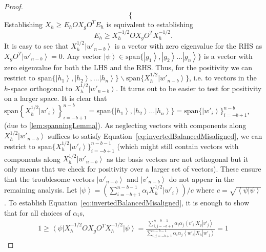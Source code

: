 \documentclass{theoretics}
\begin{document}
\begin{proof}
\begin{displaymath}
\begin{cases}
    \end{cases}
  \end{displaymath}
  Establishing $X_{h}\ge E_{h}OX_{g}O^{T}E_{h}$ is equivalent
  to establishing
  \begin{equation}
    E_{h}\ge X_{h}^{-1/2}OX_{g}O^{T}X_{h}^{-1/2}.\label{eq:invertedBalancedMisaligned}
  \end{equation}
  It is easy to see that $X_{h}^{1/2}\left|w'_{n-b}\right\rangle $
  is a vector with zero eigenvalue for the RHS as $X_{g}O^{T}\left|w'_{n-b}\right\rangle =0$.
  Any vector $\left|\psi\right\rangle \in\text{span}\{\left|g_{1}\right\rangle ,\left|g_{2}\right\rangle \dots\left|g_{n}\right\rangle \}$
  is a vector with zero eigenvalue for both the LHS and the RHS. Thus, for
  the positivity we can restrict to $\text{span}\{\left|h_{1}\right\rangle ,\left|h_{2}\right\rangle ,\dots\left|h_{n}\right\rangle \}\backslash\text{span}\{X_{h}^{1/2}\left|w'_{n-b}\right\rangle \}$,
  i.e. to vectors in the $h$-space orthogonal to $X_{h}^{1/2}\left|w'_{n-b}\right\rangle $.
  It turns out to be easier to test for positivity on a larger
  space. It is clear that $\text{span}\left\{ X_{h}^{1/2}\left|w'_{i}\right\rangle \right\} _{i=-b+1}^{n-b}=\text{span}\{\left|h_{1}\right\rangle ,\left|h_{2}\right\rangle \dots\left|h_{n}\right\rangle \}=\text{span}\{\left|w' _{i}\right\rangle\}_{i=-b+1}^{n-b}$,
  (due to \cref{lem:spanningLemma}). As neglecting vectors with components
  along $X_{h}^{1/2}\left|w'_{n-b}\right\rangle $ suffices to satisfy Equation~\eqref{eq:invertedBalancedMisaligned}, we can restrict
  to $\text{span}\{X_{h}^{1/2}\left|w'_{i}\right\rangle \}_{i=-b+1}^{n-b-1}$
  (which might still contain vectors with components along $X_{h}^{1/2}\left|w'_{n-b}\right\rangle $
  as the basis vectors are not orthogonal but it only means that we
  check for positivity over a larger set of vectors). These ensure that
  the troublesome vectors  $\left|w'_{n-b}\right\rangle $ and
  $\left|v'_{n-b}\right\rangle $ do not appear in the remaining analysis.
  Let $\left|\psi\right\rangle =\left(\sum_{i=-b+1}^{n-b-1}\alpha_{i}X_{h}^{1/2}\left|w'_{i}\right\rangle \right)/c$
  where $c=\sqrt{\left\langle \psi|\psi\right\rangle }$. To establish
  Equation~\eqref{eq:invertedBalancedMisaligned}, it is enough to show that for
  all choices of $\alpha_{i}$s,
  \begin{align}
    1  \ge\left\langle \psi\right|X_{h}^{-1/2}OX_{g}O^{T}X_{h}^{-1/2}\left|\psi\right\rangle
    =\frac{\sum_{i,j=-b+1}^{n-b-1}\alpha_{i}\alpha_{j}\left\langle v'_{i}\right|X_{g}\left|v'_{j}\right\rangle }{\sum_{i,j=-b+1}^{n-b-1}\alpha_{i}\alpha_{j}\left\langle w'_{i}\right|X_{h}\left|w'_{j}\right\rangle } =1 \label{eq:ratioForInequality}

\end{align}
\end{proof}
\end{document}
